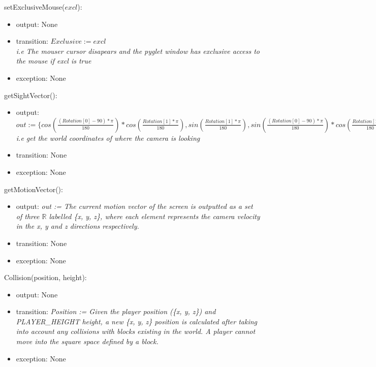 \documentclass[12pt]{article}
\begin{document}
\noindent setExclusiveMouse($excl$):
\begin{itemize}
\item output: None
\item transition: $Exclusive := excl$\\
\textit{i.e The mouser cursor disapears and the pyglet window has exclusive access to the mouse if excl is true}
\item exception: None\\
\end{itemize}

\noindent getSightVector():
\begin{itemize}
\item output: $out := \{ cos(\frac{(Rotation[0] - 90)* \pi}{180}) * cos(\frac{Rotation[1]*\pi}{180}) , sin(\frac{Rotation[1]*\pi}{180}), sin(\frac{(Rotation[0] - 90)* \pi}{180}) * cos(\frac{Rotation[1]*\pi}{180})  \}$ \textit{i.e get the world coordinates of where the camera is looking}
\item transition: None 
\item exception: None\\
\end{itemize}

\noindent getMotionVector():
\begin{itemize}
\item output: \textit{out := The current motion vector of the screen is outputted as a set of three $\mathbb{R}$ labelled \{x, y, z\}, where each element represents the camera velocity in the x, y and z directions respectively.}
\item transition: None
\item exception: None\\
\end{itemize}

\noindent Collision(position, height):
\begin{itemize}
\item output: None
\item transition: \textit{Position := Given the player position (\{x, y, z\}) and PLAYER\_HEIGHT height, a new \{x, y, z\} position is calculated after taking into account any collisions with blocks existing in the world. A player cannot move into the square space defined by a block.}
\item exception: None\\
\end{itemize}
\end{document}
